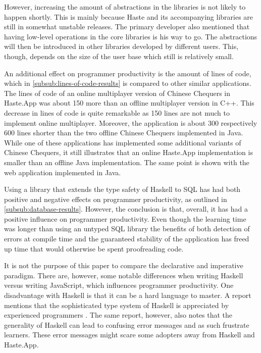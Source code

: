 \documentclass[a4paper]{article}
\begin{document}
However, increasing the amount of abstractions in the libraries is not likely to happen shortly. This is mainly because Haste and its accompanying libraries are still in somewhat unstable releases. The primary developer also mentioned that having low-level operations in the core libraries is his way to go. The abstractions will then be introduced in other libraries developed by different users. This, though, depends on the size of the user base which still is relatively small.

An additional effect on programmer productivity is the amount of lines of code, which in \cref{subsub:lines-of-code-results} is compared to other similar applications. The lines of code of an online multiplayer version of Chinese Chequers in Haste.App was about 150 more than an offline multiplayer version in C++. This decrease in lines of code is quite remarkable as 150 lines are not much to implement online multiplayer. Moreover, the application is about 300 respectively 600 lines shorter than the two offline Chinese Chequers implemented in Java. While one of these applications has implemented some additional variants of Chinese Chequers, it still illustrates that an online Haste.App implementation is smaller than an offline Java implementation. The same point is shown with the web application implemented in Java.

Using a library that extends the type safety of Haskell to SQL has had both positive and negative effects on programmer productivity, as outlined in \cref{subsub:database-results}. However, the conclusion is that, overall, it has had a positive influence on programmer productivity. Even though the learning time was longer than using an untyped SQL library the benefits of both detection of errors at compile time and the guaranteed stability of the application has freed up time that would otherwise be spent proofreading code.

It is not the purpose of this paper to compare the declarative and imperative paradigm. There are, however, some notable differences when writing Haskell versus writing JavaScript, which influences programmer productivity. One disadvantage with Haskell is that it can be a hard language to master. A report mentions that the sophisticated type system of Haskell is appreciated by experienced programmers \cite{heliumHaskell}. The same report, however, also notes that the generality of Haskell can lead to confusing error messages and as such frustrate learners. These error messages might scare some adopters away from Haskell and Haste.App.
\end{document}
